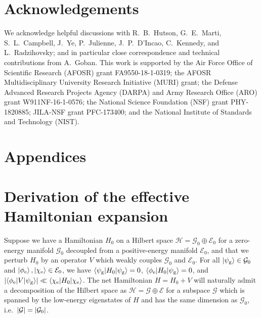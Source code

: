 \documentclass[preprint,showkeys,nofootinbib]{revtex4-1}
\newcommand{\bk}{\braket} %
\newcommand{\g}{\text{g}}
\newcommand{\e}{\text{e}}
\newcommand{\E}{\mathcal{E}}
\newcommand{\G}{\mathcal{G}}
\renewcommand{\H}{\mathcal{H}}
\newcommand{\1}{\mathds{1}}
\begin{document}

\section*{Acknowledgements}

We acknowledge helpful discussions with R.~B.~Hutson, G.~E.~Marti,
S.~L.~Campbell, J.~Ye, P.~Julienne, J.~P.~D'Incao, C.~Kennedy, and
L.~Radzihovsky; and in particular close correspondence and technical
contributions from A.~Goban.  This work is supported by the Air Force
Office of Scientific Research (AFOSR) grant FA9550-18-1-0319; the
AFOSR Multidisciplinary University Research Initiative (MURI) grant;
the Defense Advanced Research Projects Agency (DARPA) and Army
Research Office (ARO) grant W911NF-16-1-0576; the National Science
Foundation (NSF) grant PHY-1820885; JILA-NSF grant PFC-173400; and the
National Institute of Standards and Technology (NIST).



\section*{Appendices}
\appendix
\setcounter{figure}{0}
\renewcommand\thefigure{\thesection.\arabic{figure}}


\section{Derivation of the effective Hamiltonian expansion}
\label{sec:eff_derivation}

Suppose we have a Hamiltonian $H_0$ on a Hilbert space
$\H=\G_0\oplus\E_0$ for a zero-energy manifold $\G_0$ decoupled from a
positive-energy manifold $\E_0$, and that we perturb $H_0$ by an
operator $V$ which weakly couples $\G_0$ and $\E_0$.  For all
$\ket{\psi_\g}\in\G_0$ and $\ket{\phi_\e},\ket{\chi_\e}\in\E_0$, we
have $\bk{\psi_\g|H_0|\psi_\g}=0$, $\bk{\phi_\e|H_0|\psi_\g}=0$, and
$\abs{\bk{\phi_\e|V|\psi_\g}}\ll\bk{\chi_\e|H_0|\chi_\e}$.  The net
Hamiltonian $H=H_0+V$ will naturally admit a decomposition of the
Hilbert space as $\H=\G\oplus\E$ for a subspace $\G$ which is spanned
by the low-energy eigenstates of $H$ and has the same dimension as
$\G_0$, i.e.~$\abs{\G}=\abs{\G_0}$.
\end{document}
